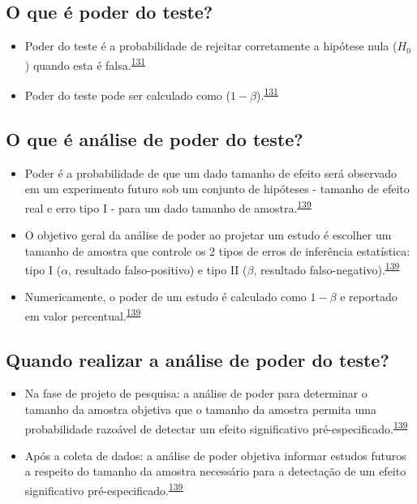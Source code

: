 \documentclass[
]{book}
\begin{document}
\hypertarget{o-que-uxe9-poder-do-teste}{%
\subsection{O que é poder do teste?}\label{o-que-uxe9-poder-do-teste}}

\begin{itemize}
\item
  Poder do teste é a probabilidade de rejeitar corretamente a hipótese nula (\(H_{0}\)) quando esta é falsa.\textsuperscript{\protect\hyperlink{ref-Curran-Everett2009}{131}}
\item
  Poder do teste pode ser calculado como (\(1 - \beta\)).\textsuperscript{\protect\hyperlink{ref-Curran-Everett2009}{131}}
\end{itemize}

\hypertarget{o-que-uxe9-anuxe1lise-de-poder-do-teste}{%
\subsection{O que é análise de poder do teste?}\label{o-que-uxe9-anuxe1lise-de-poder-do-teste}}

\begin{itemize}
\item
  Poder é a probabilidade de que um dado tamanho de efeito será observado em um experimento futuro sob um conjunto de hipóteses - tamanho de efeito real e erro tipo I - para um dado tamanho de amostra.\textsuperscript{\protect\hyperlink{ref-heckman2022}{139}}
\item
  O objetivo geral da análise de poder ao projetar um estudo é escolher um tamanho de amostra que controle os 2 tipos de erros de inferência estatística: tipo I (\(\alpha\), resultado falso-positivo) e tipo II (\(\beta\), resultado falso-negativo).\textsuperscript{\protect\hyperlink{ref-heckman2022}{139}}
\item
  Numericamente, o poder de um estudo é calculado como \(1-\beta\) e reportado em valor percentual.\textsuperscript{\protect\hyperlink{ref-heckman2022}{139}}
\end{itemize}

\hypertarget{quando-realizar-a-anuxe1lise-de-poder-do-teste}{%
\subsection{Quando realizar a análise de poder do teste?}\label{quando-realizar-a-anuxe1lise-de-poder-do-teste}}

\begin{itemize}
\item
  Na fase de projeto de pesquisa: a análise de poder para determinar o tamanho da amostra objetiva que o tamanho da amostra permita uma probabilidade razoável de detectar um efeito significativo pré-especificado.\textsuperscript{\protect\hyperlink{ref-heckman2022}{139}}
\item
  Após a coleta de dados: a análise de poder objetiva informar estudos futuros a respeito do tamanho da amostra necessário para a detectação de um efeito significativo pré-especificado.\textsuperscript{\protect\hyperlink{ref-heckman2022}{139}}
\end{itemize}
\end{document}
